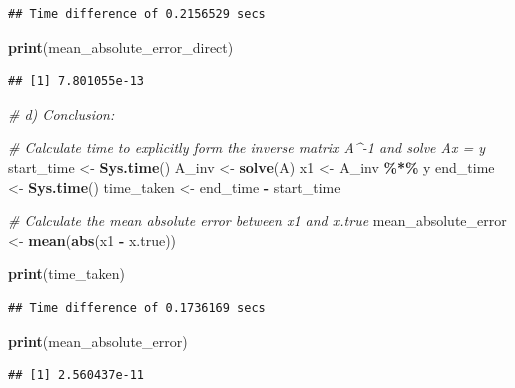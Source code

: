 \documentclass[
]{article}
\newenvironment{Shaded}{\begin{snugshade}}{\end{snugshade}}
\newcommand{\CommentTok}[1]{\textcolor[rgb]{0.56,0.35,0.01}{\textit{#1}}}
\newcommand{\FunctionTok}[1]{\textcolor[rgb]{0.13,0.29,0.53}{\textbf{#1}}}
\newcommand{\NormalTok}[1]{#1}
\newcommand{\OtherTok}[1]{\textcolor[rgb]{0.56,0.35,0.01}{#1}}
\newcommand{\SpecialCharTok}[1]{\textcolor[rgb]{0.81,0.36,0.00}{\textbf{#1}}}
\begin{document}
\begin{verbatim}
## Time difference of 0.2156529 secs
\end{verbatim}

\begin{Shaded}
\begin{Highlighting}[]
\FunctionTok{print}\NormalTok{(mean\_absolute\_error\_direct)}
\end{Highlighting}
\end{Shaded}

\begin{verbatim}
## [1] 7.801055e-13
\end{verbatim}

\begin{Shaded}
\begin{Highlighting}[]
\CommentTok{\# d) Conclusion:}

\CommentTok{\# Calculate time to explicitly form the inverse matrix A\^{}{-}1 and solve Ax = y}
\NormalTok{start\_time }\OtherTok{\textless{}{-}} \FunctionTok{Sys.time}\NormalTok{()}
\NormalTok{A\_inv }\OtherTok{\textless{}{-}} \FunctionTok{solve}\NormalTok{(A)}
\NormalTok{x1 }\OtherTok{\textless{}{-}}\NormalTok{ A\_inv }\SpecialCharTok{\%*\%}\NormalTok{ y}
\NormalTok{end\_time }\OtherTok{\textless{}{-}} \FunctionTok{Sys.time}\NormalTok{()}
\NormalTok{time\_taken }\OtherTok{\textless{}{-}}\NormalTok{ end\_time }\SpecialCharTok{{-}}\NormalTok{ start\_time}

\CommentTok{\# Calculate the mean absolute error between x1 and x.true}
\NormalTok{mean\_absolute\_error }\OtherTok{\textless{}{-}} \FunctionTok{mean}\NormalTok{(}\FunctionTok{abs}\NormalTok{(x1 }\SpecialCharTok{{-}}\NormalTok{ x.true))}

\FunctionTok{print}\NormalTok{(time\_taken)}
\end{Highlighting}
\end{Shaded}

\begin{verbatim}
## Time difference of 0.1736169 secs
\end{verbatim}

\begin{Shaded}
\begin{Highlighting}[]
\FunctionTok{print}\NormalTok{(mean\_absolute\_error)}
\end{Highlighting}
\end{Shaded}

\begin{verbatim}
## [1] 2.560437e-11
\end{verbatim}
\end{document}
